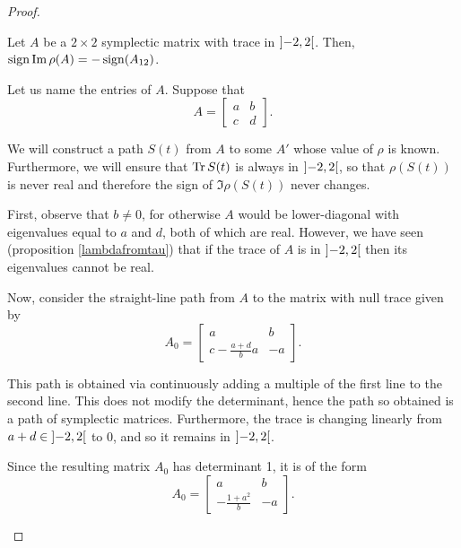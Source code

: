 \begin{proof}
\begin{lemma}
Let $A$ be a $2 \times 2$ symplectic matrix with trace in $\ointerval{-2}2$. Then, $\operatorname{sign} \operatorname{Im} \rho(A) = -\operatorname{sign}(A_{12})$.
\end{lemma}

\begin{lemmaproof}
Let us name the entries of $A$. Suppose that
\begin{equation}
A = \begin{bmatrix} a & b\\ c & d \end{bmatrix}.
\end{equation}

We will construct a path $S(t)$ from $A$ to some $A'$ whose value of $\rho$ is known. Furthermore, we will ensure that $\operatorname{Tr} S(t)$ is always in $\ointerval{-2}2$, so that $\rho(S(t))$ is never real and therefore the sign of $\Im \rho(S(t))$ never changes.

First, observe that $b \neq 0$, for otherwise $A$ would be lower-diagonal with eigenvalues equal to $a$ and $d$, both of which are real. However, we have seen (proposition \ref{lambdafromtau}) that if the trace of $A$ is in $\ointerval{-2}2$ then its eigenvalues cannot be real.

Now, consider the straight-line path from $A$ to the matrix with null trace given by
\begin{equation}
A_0 = \begin{bmatrix}
a & b\\
c-\frac{a+d}b a & -a
\end{bmatrix}.
\end{equation}

This path is obtained via continuously adding a multiple of the first line to the second line. This does not modify the determinant, hence the path so obtained is a path of symplectic matrices. Furthermore, the trace is changing linearly from $a+d \in \ointerval{-2}2$ to $0$, and so it remains in $\ointerval{-2}2$.

Since the resulting matrix $A_0$ has determinant 1, it is of the form
\begin{equation}
A_0 = \begin{bmatrix}
a & b\\
-\frac{1+a^2}b & -a
\end{bmatrix}.
\end{equation}


\end{lemmaproof}
\end{proof}
